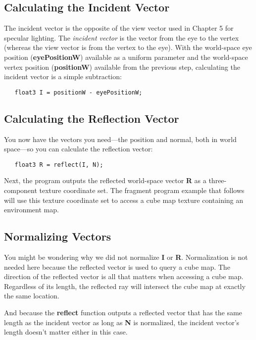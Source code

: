 \documentclass[../main.tex]{subfiles}
\begin{document}
\subsection*{Calculating the Incident Vector}

The incident vector is the opposite of the view vector used in Chapter 5 for specular lighting. The \textit{incident vector} is the vector from the eye to the vertex (whereas the view vector is from the vertex to the eye). With the world-space eye position (\textbf{eyePositionW}) available as a uniform parameter and the world-space vertex position (\textbf{positionW}) available from the previous step, calculating the incident vector is a simple subtraction:

\FloatBarrier
\begin{lstlisting}
   float3 I = positionW - eyePositionW;
\end{lstlisting}
\FloatBarrier
   
\subsection*{Calculating the Reflection Vector}

You now have the vectors you need—the position and normal, both in world space—so you can calculate the reflection vector:

\FloatBarrier
\begin{lstlisting}
   float3 R = reflect(I, N);
\end{lstlisting}
\FloatBarrier
   
Next, the program outputs the reflected world-space vector \textbf{R} as a three-component texture coordinate set. The fragment program example that follows will use this texture coordinate set to access a cube map texture containing an environment map.

\subsection*{Normalizing Vectors}

You might be wondering why we did not normalize \textbf{I} or \textbf{R}. Normalization is not needed here because the reflected vector is used to query a cube map. The direction of the reflected vector is all that matters when accessing a cube map. Regardless of its length, the reflected ray will intersect the cube map at exactly the same location.

And because the \textbf{reflect} function outputs a reflected vector that has the same length as the incident vector as long as \textbf{N} is normalized, the incident vector's length doesn't matter either in this case.
\end{document}
